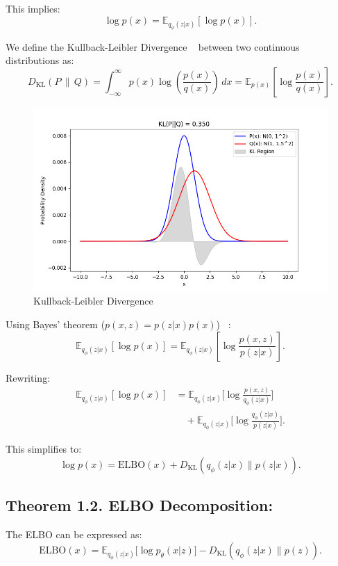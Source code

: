 This implies:
\[
\log p(x) = \mathbb{E}_{q_\phi(z|x)} [\log p(x)].
\]

We define the Kullback-Leibler Divergence ~\cite{shlens2014kl} between two continuous distributions as:
\[
D_{\text{KL}}(P \,\|\, Q) = \int_{-\infty}^\infty p(x) \log \left( \frac{p(x)}{q(x)} \right) \, dx = \mathbb{E}_{p(x)} \left[\log \frac{p(x)}{q(x)} \right].
\]

\begin{figure}[H]
    \centering
    \includegraphics[width=1\linewidth]{sec/KL.png}
    \caption{Kullback-Leibler Divergence}
\end{figure}

Using Bayes' theorem (\(p(x, z) = p(z|x)p(x)\)) ~\cite{dosovitskiy2021imageworth16x16words}:
\[
\mathbb{E}_{q_\phi(z|x)}[\log p(x)] = \mathbb{E}_{q_\phi(z|x)} \left[\log \frac{p(x, z)}{p(z|x)}\right].
\]

Rewriting:
\begin{align}
\mathbb{E}_{q_\phi(z|x)} [\log p(x)] &= \mathbb{E}_{q_\phi(z|x)} 
\Big[ \log \frac{p(x, z)}{q_\phi(z|x)} \Big] \nonumber \\
&\quad + \mathbb{E}_{q_\phi(z|x)} 
\Big[ \log \frac{q_\phi(z|x)}{p(z|x)} \Big].
\end{align}


This simplifies to:
\[
\log p(x) = \text{ELBO}(x) + D_{\mathrm{KL}}(q_\phi(z|x) \| p(z|x)).
\]

\subsection*{Theorem 1.2. ELBO Decomposition:}
The ELBO can be expressed as:
\begin{equation}
\text{ELBO}(x) = \mathbb{E}_{q_\phi(z|x)} 
\big[\log p_\theta(x|z)\big] 
- D_{\text{KL}}(q_\phi(z|x) \| p(z)).
\end{equation}


